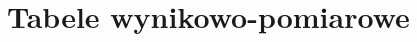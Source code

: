 \thispagestyle{empty}
\newcolumntype{C}{>{\centering\arraybackslash}}
\section{Tabele wynikowo-pomiarowe}